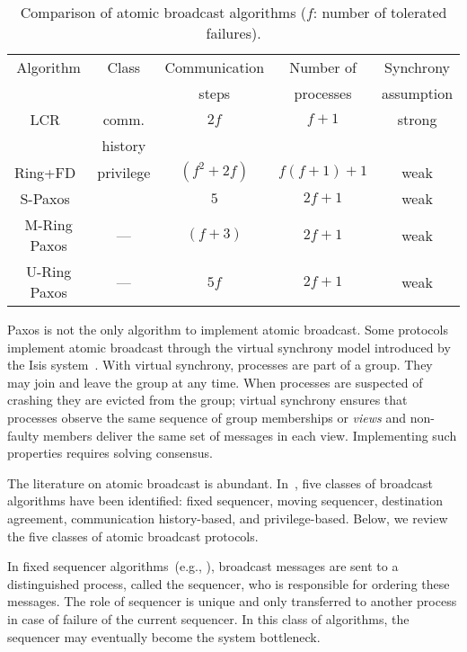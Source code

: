 \documentclass[final,3p,times,twocolumn,authoryear]{elsarticle}
\begin{document}
\begin{table*}
\center
\caption{Comparison of atomic broadcast algorithms ($f$: number of tolerated failures).}
\vspace{4mm}
\label{table:algo_comparison}

\begin{tabular}{|c|c|c|c|c|} \hline

Algorithm				& Class	& Communication	& Number of  	& Synchrony	\\
					&		& steps			& processes	& assumption	\\ \hline \hline
LCR~\cite{Guerraoui2010}& comm.	& $2f$			& $f+1$		& strong		\\
                              		& history	&         			&			&			\\ \hline
Ring+FD~\cite{ESU04}  & privilege & $(f^2 + 2f)$  & $f(f+1)+1$ &
weak \\ \hline
S-Paxos~\cite{spaxos}  & & $5$  & $2f+1$ & weak \\ \hline

M-Ring Paxos & --- & $(f+3)$ & $2f+1$ & weak\\ \hline
U-Ring Paxos & --- & $5f$ & $2f+1$ & weak\\ \hline
\end{tabular}


\end{table*}


Paxos is not the only algorithm to implement atomic broadcast. 
Some protocols implement atomic broadcast through the virtual synchrony model introduced by the Isis system~\cite{BT87}. With virtual synchrony, processes are part of a group. They may join and leave the group at any time. When processes are suspected of crashing they are evicted from the group; virtual synchrony ensures that processes observe the same sequence of group memberships or \emph{views} and non-faulty members deliver the same set of messages in each view. Implementing such properties requires solving consensus. 

The literature on atomic broadcast is abundant. In~\cite{DUS04}, five classes of broadcast algorithms have been identified: fixed sequencer, moving sequencer, destination agreement, communication history-based, and privilege-based. Below, we review the five classes of atomic broadcast protocols.

In fixed sequencer algorithms~(e.g., \cite{BSS91,KT91}), broadcast messages are sent to a distinguished process, called the sequencer, who is responsible for ordering these messages. The role of sequencer is unique and only transferred to another process in case of failure of the current sequencer. In this class of algorithms, the sequencer may eventually become the system bottleneck. 
\end{document}
